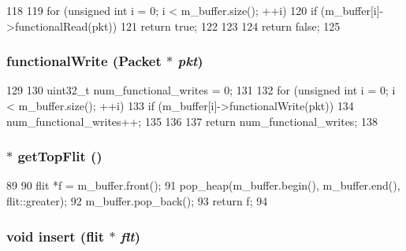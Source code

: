 \begin{DoxyCode}
118 {
119     for (unsigned int i = 0; i < m_buffer.size(); ++i) {
120         if (m_buffer[i]->functionalRead(pkt)) {
121             return true;
122         }
123     }
124     return false;
125 }
\end{DoxyCode}
\hypertarget{classflitBuffer_aba9037f662122b5f2e85647d35670e5c}{
\subsubsection[{functionalWrite}]{ functionalWrite ({\bf Packet} $\ast$ {\em pkt})}}
\label{classflitBuffer_aba9037f662122b5f2e85647d35670e5c}



\begin{DoxyCode}
129 {
130     uint32_t num_functional_writes = 0;
131 
132     for (unsigned int i = 0; i < m_buffer.size(); ++i) {
133         if (m_buffer[i]->functionalWrite(pkt)) {
134             num_functional_writes++;
135         }
136     }
137     return num_functional_writes;
138 }
\end{DoxyCode}
\hypertarget{classflitBuffer_aef06e3e3a0dc69f7371e17f090dd6758}{
\subsubsection[{getTopFlit}]{ $\ast$ getTopFlit ()}}
\label{classflitBuffer_aef06e3e3a0dc69f7371e17f090dd6758}



\begin{DoxyCode}
89 {
90     flit *f = m_buffer.front();
91     pop_heap(m_buffer.begin(), m_buffer.end(), flit::greater);
92     m_buffer.pop_back();
93     return f;
94 }
\end{DoxyCode}
\hypertarget{classflitBuffer_abdd88df99d32b605d0850f09dd90581f}{
\subsubsection[{insert}]{\setlength{\rightskip}{0pt plus 5cm}void insert ({\bf flit} $\ast$ {\em flt})}}
\label{classflitBuffer_abdd88df99d32b605d0850f09dd90581f}



